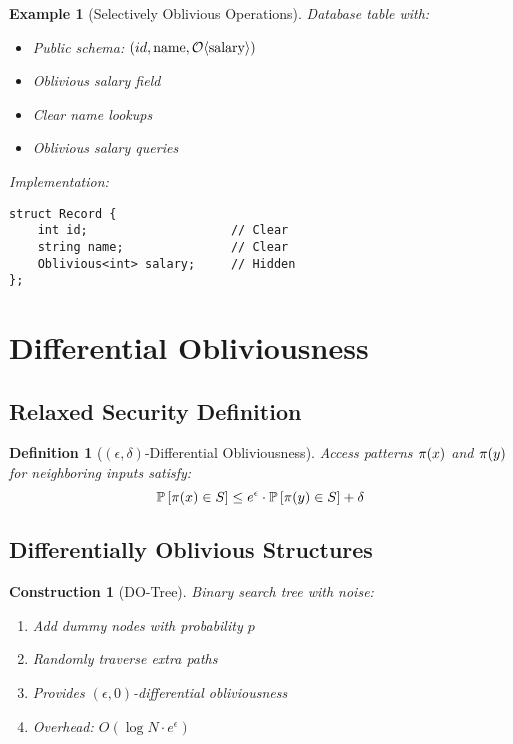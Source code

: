 \documentclass[11pt,final,hidelinks]{article}
\newtheorem{definition}[theorem]{Definition}
\newtheorem{example}[theorem]{Example}
\newtheorem{construction}[theorem]{Construction}
\begin{document}
\begin{example}[Selectively Oblivious Operations]
Database table with:
\begin{itemize}
    \item Public schema: $(id, \text{name}, \mathcal{O}\langle \text{salary} \rangle)$
    \item Oblivious salary field
    \item Clear name lookups
    \item Oblivious salary queries
\end{itemize}
Implementation:
\begin{verbatim}
struct Record {
    int id;                    // Clear
    string name;               // Clear
    Oblivious<int> salary;     // Hidden
};
\end{verbatim}
\end{example}

\section{Differential Obliviousness}

\subsection{Relaxed Security Definition}

\begin{definition}[$(\epsilon, \delta)$-Differential Obliviousness]
Access patterns $\pi(x)$ and $\pi(y)$ for neighboring inputs satisfy:
\begin{equation}
\mathbb{P}\left[\pi(x) \in S\right] \leq e^\epsilon \cdot \mathbb{P}\left[\pi(y) \in S\right] + \delta
\end{equation}
\end{definition}

\subsection{Differentially Oblivious Structures}

\begin{construction}[DO-Tree]
Binary search tree with noise:
\begin{enumerate}
    \item Add dummy nodes with probability $p$
    \item Randomly traverse extra paths
    \item Provides $(\epsilon, 0)$-differential obliviousness
    \item Overhead: $O(\log N \cdot e^\epsilon)$
\end{enumerate}
\end{construction}
\end{document}
